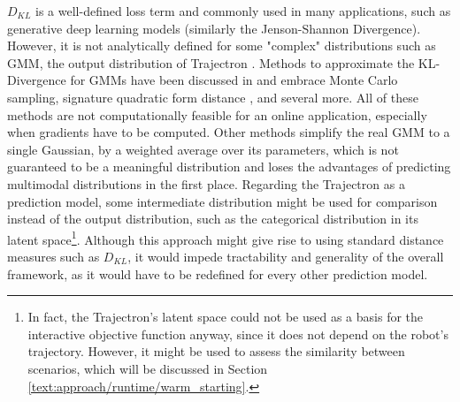$D_{KL}$ is a well-defined loss term and commonly used in many applications, such as generative deep learning models \cite{Goodfellow2014}\cite{Salzmann2020} (similarly the Jenson-Shannon Divergence). However, it is not analytically defined for some "complex" distributions such as \ac{GMM}, the output distribution of Trajectron \cite{Ivanovic2018}. Methods to approximate the KL-Divergence for \ac{GMM}s have been discussed in \cite{Cui2015} and embrace Monte Carlo sampling, signature quadratic form distance \cite{Beecks2011}, and several more. All of these methods are not computationally feasible for an online application, especially when gradients have to be computed. Other methods simplify the real \ac{GMM} to a single Gaussian, by a weighted average over its parameters, which is not guaranteed to be a meaningful distribution and loses the advantages of predicting multimodal distributions in the first place.
\newline
Regarding the Trajectron \cite{Ivanovic2018} as a prediction model, some intermediate distribution might be used for comparison instead of the output distribution, such as the categorical distribution in its latent space\footnote{In fact, the Trajectron's latent space could not be used as a basis for the interactive objective function anyway, since it does not depend on the robot's trajectory. However, it might be used to assess the similarity between scenarios, which will be discussed in Section \ref{text:approach/runtime/warm_starting}.}. Although this approach might give rise to using standard distance measures such as $D_{KL}$, it would impede tractability and generality of the overall framework, as it would have to be redefined for every other prediction model.

